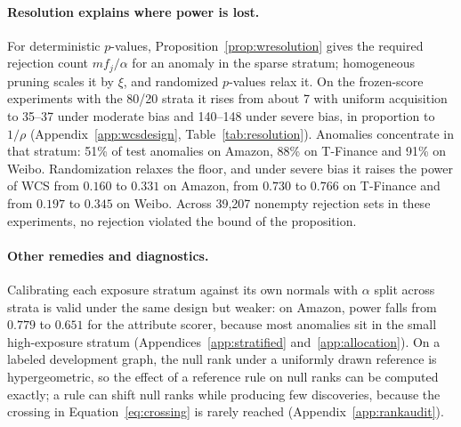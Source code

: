 \documentclass[twoside]{article}
\begin{document}
\paragraph{Resolution explains where power is lost.}
For deterministic $p$-values, Proposition~\ref{prop:wresolution} gives the required rejection count $mf_j/\alpha$ for an anomaly in the sparse stratum; homogeneous pruning scales it by $\xi$, and randomized $p$-values relax it. On the frozen-score experiments with the 80/20 strata it rises from about 7 with uniform acquisition to 35--37 under moderate bias and 140--148 under severe bias, in proportion to $1/\rho$ (Appendix~\ref{app:wcsdesign}, Table~\ref{tab:resolution}). Anomalies concentrate in that stratum: 51\% of test anomalies on Amazon, 88\% on T-Finance and 91\% on Weibo. Randomization relaxes the floor, and under severe bias it raises the power of WCS from $0.160$ to $0.331$ on Amazon, from $0.730$ to $0.766$ on T-Finance and from $0.197$ to $0.345$ on Weibo. Across 39,207 nonempty rejection sets in these experiments, no rejection violated the bound of the proposition.

\paragraph{Other remedies and diagnostics.}
Calibrating each exposure stratum against its own normals with $\alpha$ split across strata is valid under the same design but weaker: on Amazon, power falls from $0.779$ to $0.651$ for the attribute scorer, because most anomalies sit in the small high-exposure stratum (Appendices~\ref{app:stratified} and~\ref{app:allocation}). On a labeled development graph, the null rank under a uniformly drawn reference is hypergeometric, so the effect of a reference rule on null ranks can be computed exactly; a rule can shift null ranks while producing few discoveries, because the crossing in Equation~\eqref{eq:crossing} is rarely reached (Appendix~\ref{app:rankaudit}).
\end{document}
